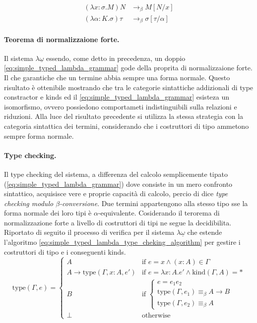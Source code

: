 \begin{align}
    (\lambda x : \sigma. M) N & \to_\beta M[N/x] 
    \tag{Term-level $\beta$} 
    \label{eq:term_beta_reduction} \\
    (\lambda \alpha : K. \sigma) \tau & \to_\beta \sigma[\tau/\alpha] 
    \tag{Type-level $\beta$}
    \label{eq:type_system_omega_under_beta_reduction} 
\end{align}

\paragraph{Teorema di normalizzaione forte.}
Il sistema $\lambda\underline{\omega}$ essendo, come detto in precedenza, un doppio \ref{eq:simple_typed_lambda_grammar} gode della proprita di normalizzaione forte.
Il che garantiche che un termine abbia sempre una forma normale. Questo risultato è ottenibile mostrando che tra le categorie sintattiche addizionali di type constractor
e kinds ed il \ref{eq:simple_typed_lambda_grammar} esisteza un isomorfismo, ovvero possiedono comportameti indistinguibili sulla relazioni e riduzioni. Alla luce del 
risultato precedente si utilizza la stessa strategia con la categoria sintattica dei termini, considerando che i costruttori di tipo ammetono sempre forma normale.

\paragraph{Type checking.}
Il type checking del sistema, a differenza del calcolo semplicemente tipato (\ref{eq:simple_typed_lambda_grammar}) dove consiste in un mero confronto sintattico, 
acquisisce vere e proprie capacità di calcolo, percio di dice \emph{type checking modulo $\beta$-conversione}. Due termini appartengono alla stesso tipo sse la 
forma normale dei loro tipi è $\alpha$-equivalente. Cosiderando il terorema di normalizzazione forte a livello di costruttori di tipi ne segue la decidibilita.
Riportato di seguito il processo di verifica per il sistema $\lambda\underline{\omega}$ che estende l'algoritmo \eqref{eq:simple_typed_lambda_type_cheking_algorithm} 
per gestire i costruttori di tipo e i conseguenti kinds.
\begin{equation}
    \text{type}(\Gamma, e) =
    \begin{cases}
        A & \text{if } e = x \land (x : A) \in \Gamma \\
        A \to \text{type}(\Gamma, x:A, e') & \text{if } e = \lambda x : A . e' \land \text{kind}(\Gamma, A) = \ast \\
        B & \text{if }
            \begin{cases}
                e = e_1 e_2 \\
                \text{type}(\Gamma, e_1) \equiv_\beta A \to B \\
                \text{type}(\Gamma, e_2) \equiv_\beta A
            \end{cases} \\
        \perp & \text{otherwise}
    \end{cases}
\end{equation}

